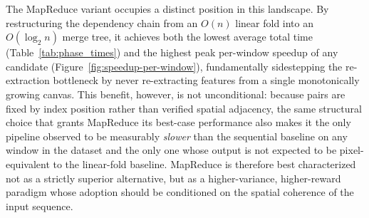 \documentclass[10pt,twocolumn,letterpaper]{article}
\begin{document}
The MapReduce variant occupies a distinct position in this landscape. By restructuring the
dependency chain from an $O(n)$ linear fold into an $O(\log_2 n)$ merge tree, it achieves both
the lowest average total time (Table~\ref{tab:phase_times}) and the highest peak per-window
speedup of any candidate (Figure~\ref{fig:speedup-per-window}), fundamentally sidestepping the
re-extraction bottleneck by never re-extracting features from a single monotonically growing
canvas. This benefit, however, is not unconditional: because pairs are fixed by index position
rather than verified spatial adjacency, the same structural choice that grants MapReduce its
best-case performance also makes it the only pipeline observed to be measurably \emph{slower}
than the sequential baseline on any window in the dataset and the only one whose output is not
expected to be pixel-equivalent to the linear-fold baseline. MapReduce is therefore best
characterized not as a strictly superior alternative, but as a higher-variance,
higher-reward paradigm whose adoption should be conditioned on the spatial coherence of the
input sequence.

{\small


}
\end{document}
